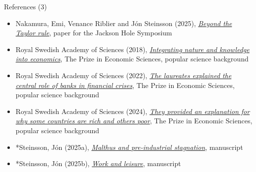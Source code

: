 \documentclass[10pt,handout]{beamer}
\begin{document}
\begin{frame}{References (3)}
\begin{itemize}

    \item Nakamura, Emi, Venance Riblier and Jón Steinsson (2025), \href{https://eml.berkeley.edu/~jsteinsson/papers/Taylor_Rule.pdf}{\emph{Beyond the Taylor rule}}, paper for the Jackson Hole Symposium

    \item Royal Swedish Academy of Sciences (2018), \href{https://www.nobelprize.org/uploads/2018/10/popular-economicsciencesprize2018.pdf}{\emph{Integrating nature and knowledge into economics}}, The Prize in Economic Sciences, popular science background

    \item Royal Swedish Academy of Sciences (2022), \href{https://www.nobelprize.org/uploads/2022/10/popular-economicsciencesprize2022-2.pdf}{\emph{The laureates explained the central role of banks in financial crises}}, The Prize in Economic Sciences, popular science background

    \item Royal Swedish Academy of Sciences (2024), \href{https://www.nobelprize.org/uploads/2024/10/popular-economicsciencesprize2024.pdf}{\emph{They provided an explanation for why some countries are rich and others poor}}, The Prize in Economic Sciences, popular science background

    \item *Steinsson, Jón (2025a), \href{https://eml.berkeley.edu/~jsteinsson/teaching/malthus.pdf}{\emph{Malthus and pre-industrial stagnation}}, manuscript

    \item *Steinsson, Jón (2025b), \href{https://eml.berkeley.edu/~jsteinsson/teaching/labor.pdf}{\emph{Work and leisure}}, manuscript

\end{itemize}
\end{frame}
\end{document}
